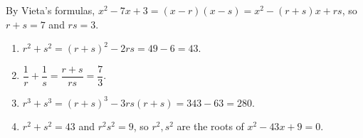 By Vieta's formulas, $x^2-7x+3=(x-r)(x-s)=x^2-(r+s)x+rs$, so $r+s=7$ and $rs=3$.
\begin{enumerate}
\item[(a)] $r^2+s^2=(r+s)^2-2rs=49-6=\boxed{43}$.
\item[(b)] $\dfrac{1}{r}+\dfrac{1}{s}=\dfrac{r+s}{rs}=\boxed{\dfrac{7}{3}}$.
\item[(c)] $r^3+s^3=(r+s)^3-3rs(r+s)=343-63=\boxed{280}$.
\item[(d)] $r^2+s^2=43$ and $r^2s^2=9$, so $r^2,s^2$ are the roots of $\boxed{x^2-43x+9=0}$.
\end{enumerate}
